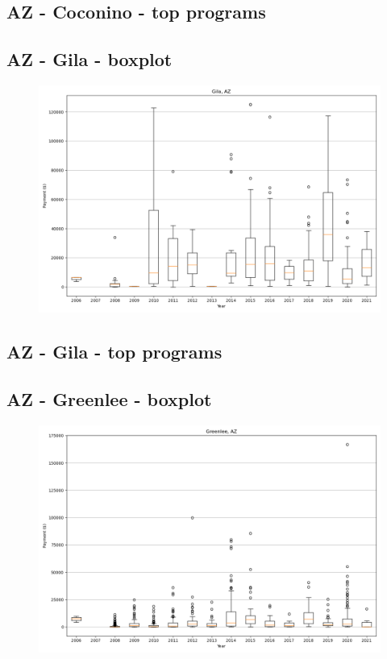 \subsection*{AZ - Coconino - top programs}

\newpage
\subsection*{AZ - Gila - boxplot}
\begin{figure}[h]
\centering
\includegraphics[width=7in]{../output/boxplots/counties/Gila-AZ_boxplot.png}
\end{figure}


\subsection*{AZ - Gila - top programs}

\newpage
\subsection*{AZ - Greenlee - boxplot}
\begin{figure}[h]
\centering
\includegraphics[width=7in]{../output/boxplots/counties/Greenlee-AZ_boxplot.png}
\end{figure}


